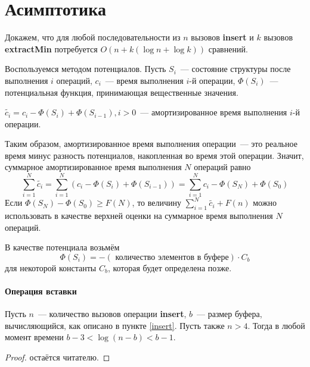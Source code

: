 \section{Асимптотика}
Докажем, что для любой последовательности из $n$ вызовов \textbf{insert}
и $k$ вызовов \textbf{extractMin} потребуется $O(n + k(\log n + \log k))$
сравнений.


Воспользуемся методом потенциалов. Пусть $S_i$~--- состояние структуры
после выполнения $i$ операций, $c_i$~--- время выполнения $i$-й операции,
$\Phi(S_i)$~--- потенциальная функция, принимающая вещественные значения.

\begin{definition}
$\tilde{c_i} = c_i - \Phi(S_i) + \Phi(S_{i-1}), i > 0$~--- амортизированное время
выполнения $i$-й операции.
\end{definition}
Таким образом, амортизированное время выполнения операции~--- это реальное время
минус разность потенциалов, накопленная во время этой операции. Значит, суммарное
амортизированное время выполнения $N$ операций равно
$$
\sum_{i=1}^N\tilde{c_i} = \sum_{i=1}^N(c_i - \Phi(S_i) + \Phi(S_{i-1})) =
\sum_{i=1}^Nc_i - \Phi(S_N) + \Phi(S_0)
$$
Если $\Phi(S_N) - \Phi(S_0) \geq F(N)$, то величину $\sum_{i=1}^N\tilde{c_i} + F(n)$
можно использовать в качестве верхней оценки на суммарное время выполнения $N$ операций.


В качестве потенциала возьмём 
$$\Phi(S_i)=-( \text{ количество элементов в буфере}) \cdot C_b$$
для некоторой константы
$C_b$, которая будет определена позже.

\paragraph{Операция вставки}

\begin{theorem} \label{BufferIsLargeEnough}
Пусть $n$~--- количество вызовов операции \textbf{insert}, $b$~--- размер
буфера, вычисляющийся, как описано в пункте \ref{insert}.
Пусть также $n > 4$. 
Тогда в любой момент времени $b - 3 < \log (n - b) < b - 1$.
\end{theorem}
\begin{proof}
остаётся читателю. 
\end{proof}

